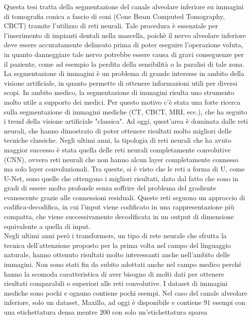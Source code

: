 \documentclass[11pt, oneside]{Thesis} %
\begin{document}
{Questa tesi tratta della segmentazione del canale alveolare inferiore su
immagini di tomografia conica a fascio di coni (Cone Beam Computed Tomography,
CBCT) tramite l'utilizzo di reti neurali. Tale procedura è essenziale per
l'inserimento di impianti dentali nella mascella, poichè il nervo alveolare
inferiore deve essere accuratamente delineato prima di poter eseguire l'operazione
voluta, in quanto danneggiare tale nervo potrebbe essere causa di gravi
conseguenze per il paziente, come ad esempio la perdita della sensibilità o la
paralisi di tale zona.\\
La segmentazione di immagini è un problema di grande interesse in ambito della
visione artificiale, in quanto permette di ottenere informazioni utili per
diversi scopi. In ambito medico, la segmentazione di immagini risulta uno
strumento molto utile a supporto dei medici. Per questo motivo c'è stata una
forte ricerca sulla segmentazione di immagini mediche (CT, CBCT, MRI, ecc.), che
ha seguito i trend della visione artificiale "classica". Ad oggi, quest'area è
dominata dalle reti neurali, che hanno dimostrato di poter ottenere risultati
molto migliori delle tecniche classiche. Negli ultimi anni, la tipologia di reti
neurali che ha avuto maggior successo è stata quella delle reti neurali
completamente convolutive (CNN), ovvero reti neurali che non hanno alcun layer
completamente connesso ma solo layer convoluzionali. Tra queste, si è visto che
le reti a forma di U, come U-Net, sono quelle che ottengono i migliori
risultati, dato dal fatto che sono in gradi di essere molto profonde senza
soffrire del problema del gradiente evanescente grazie alle connessioni
residuali. Queste reti seguono un approccio di codifica-decodifica, in cui
l'input viene codificato in una rappresentazione più compatta, che viene
successivamente decodificata in un output di dimensione equivalente a quella di
input.\\
Negli ultimi anni però i transformers, un tipo di rete neurale che sfrutta la
tecnica dell'attenzione proposto per la prima volta nel campo del linguaggio
naturale, hanno ottenuto risultati molto interessanti anche nell'ambito delle
immagini. Non sono stati fin da subito adottati anche nel campo medico perché
hanno la scomoda caratteristica di aver bisogno di molti dati per ottenere
risultati comparabili o superiori alle reti convolutive. I dataset di immagini
mediche sono pochi e ognuno contiene pochi esempi. Nel caso del canale alveolare
inferiore, solo un dataset, Maxillo, ad oggi è disponibile e contiene $91$
esempi con una etichettatura densa mentre $200$ con solo un'etichettatura sparsa
}
\end{document}
